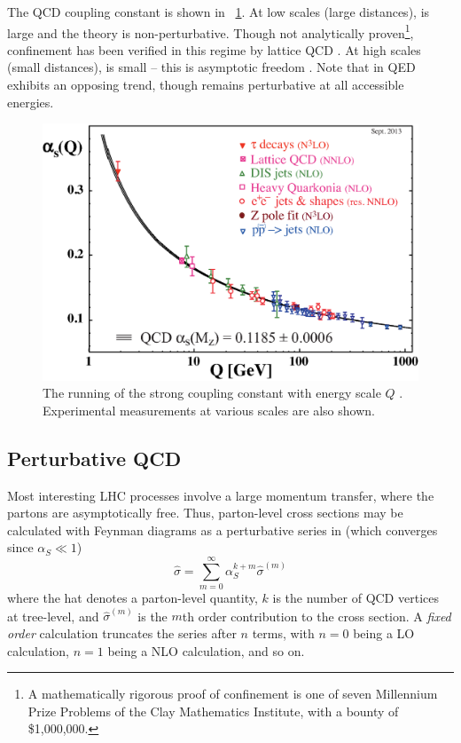 The \ac{QCD} coupling constant \alphaS is shown in \Figure~\ref{fig:alpha_s}. At low 
scales (large distances), \alphaS is large and the theory is non-perturbative. 
Though not analytically proven\footnote{
	A mathematically rigorous proof of confinement is one of seven Millennium Prize 
	Problems of the Clay Mathematics Institute, with a bounty of \$1,000,000.
}, confinement has been verified in this regime by lattice \ac{QCD} \cite{Wilson:1974}. 
At high scales (small distances), \alphaS is small -- this is asymptotic freedom 
\cite{Gross:1973,Politzer:1973}. Note that \alphaEM in \acs{QED} exhibits an opposing 
trend, though remains perturbative at all accessible energies.
\begin{figure}
	\includegraphics[width=\mediumfigwidth]{tex/tools/alpha_s}
	\caption{The running of the strong coupling constant \alphaS with energy scale $Q$ 
	\cite{PDG:2012}. Experimental measurements at various scales are also shown.}
	\label{fig:alpha_s}
\end{figure}



\subsection{Perturbative QCD}
\label{sec:qcd:pqcd}

Most interesting \acs{LHC} processes involve a large momentum transfer, where the partons 
are asymptotically free. Thus, parton-level cross sections may be calculated with Feynman 
diagrams as a perturbative series in \alphaS (which converges since $\alpha_S \ll 1$)
\begin{equation}
	\hat{\sigma} = \sum\limits_{m=0}^{\infty} \alpha_S^{k+m} \hat{\sigma}^{(m)}
	\label{eq:qcd:partonic_xs}
\end{equation}
where the hat denotes a parton-level quantity, $k$ is the number of \ac{QCD} vertices at 
tree-level, and $\hat{\sigma}^{(m)}$ is the $m$th order contribution to the cross section.
A \textit{fixed order} calculation truncates the series after $n$ terms, with $n=0$ being 
a \ac{LO} calculation, $n=1$ being a \ac{NLO} calculation, and so on.

